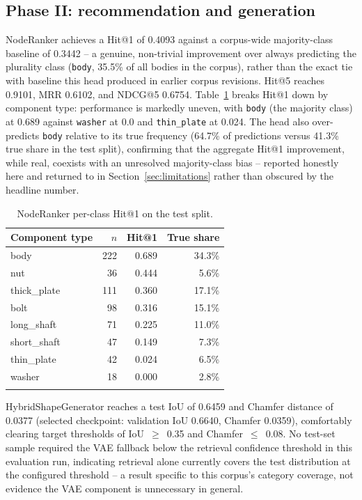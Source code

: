 \documentclass[sn-mathphys,Numbered]{sn-jnl}
\begin{document}
\subsection{Phase II: recommendation and generation}\label{sec:results-phase2}

NodeRanker achieves a Hit@1 of 0.4093 against a corpus-wide majority-class baseline of 0.3442 -- a genuine, non-trivial improvement over always predicting the plurality class (\texttt{body}, 35.5\% of all bodies in the corpus), rather than the exact tie with baseline this head produced in earlier corpus revisions. Hit@5 reaches 0.9101, MRR 0.6102, and NDCG@5 0.6754. Table~\ref{tab:perclass} breaks Hit@1 down by component type: performance is markedly uneven, with \texttt{body} (the majority class) at 0.689 against \texttt{washer} at 0.0 and \texttt{thin\_plate} at 0.024. The head also over-predicts \texttt{body} relative to its true frequency (64.7\% of predictions versus 41.3\% true share in the test split), confirming that the aggregate Hit@1 improvement, while real, coexists with an unresolved majority-class bias -- reported honestly here and returned to in Section~\ref{sec:limitations} rather than obscured by the headline number.

\begin{table}[h]
\caption{NodeRanker per-class Hit@1 on the test split.}\label{tab:perclass}
\begin{tabular}{@{}lrrr@{}}
\toprule
Component type & $n$ & Hit@1 & True share \\
\midrule
body        & 222 & 0.689 & 34.3\% \\
nut         & 36  & 0.444 & 5.6\%  \\
thick\_plate & 111 & 0.360 & 17.1\% \\
bolt        & 98  & 0.316 & 15.1\% \\
long\_shaft  & 71  & 0.225 & 11.0\% \\
short\_shaft & 47  & 0.149 & 7.3\%  \\
thin\_plate  & 42  & 0.024 & 6.5\%  \\
washer      & 18  & 0.000 & 2.8\%  \\
\botrule
\end{tabular}
\end{table}

HybridShapeGenerator reaches a test IoU of 0.6459 and Chamfer distance of 0.0377 (selected checkpoint: validation IoU 0.6640, Chamfer 0.0359), comfortably clearing target thresholds of IoU~$\geq$~0.35 and Chamfer~$\leq$~0.08. No test-set sample required the VAE fallback below the retrieval confidence threshold in this evaluation run, indicating retrieval alone currently covers the test distribution at the configured threshold -- a result specific to this corpus's category coverage, not evidence the VAE component is unnecessary in general.
\end{document}
